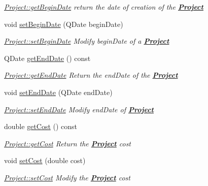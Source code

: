 \begin{DoxyCompactItemize}
\begin{DoxyCompactList}\small\item\em \hyperlink{classModels_1_1Project_a31b8e46aabb1327499f7e36f170900e3}{Project\-::get\-Begin\-Date} return the date of creation of the {\bfseries \hyperlink{classModels_1_1Project}{Project}} \end{DoxyCompactList}\item 
void \hyperlink{classModels_1_1Project_a07dfb00cbec7442197a91bc0795ab14d}{set\-Begin\-Date} (Q\-Date begin\-Date)
\begin{DoxyCompactList}\small\item\em \hyperlink{classModels_1_1Project_a07dfb00cbec7442197a91bc0795ab14d}{Project\-::set\-Begin\-Date} Modify {\itshape begin\-Date} of a {\bfseries \hyperlink{classModels_1_1Project}{Project}} \end{DoxyCompactList}\item 
Q\-Date \hyperlink{classModels_1_1Project_aaf6792d15dcd65c3708e4a01b80e3108}{get\-End\-Date} () const 
\begin{DoxyCompactList}\small\item\em \hyperlink{classModels_1_1Project_aaf6792d15dcd65c3708e4a01b80e3108}{Project\-::get\-End\-Date} Return the {\itshape end\-Date} of the {\bfseries \hyperlink{classModels_1_1Project}{Project}} \end{DoxyCompactList}\item 
void \hyperlink{classModels_1_1Project_a89e9603b862d0a282e4eb03e122e8c05}{set\-End\-Date} (Q\-Date end\-Date)
\begin{DoxyCompactList}\small\item\em \hyperlink{classModels_1_1Project_a89e9603b862d0a282e4eb03e122e8c05}{Project\-::set\-End\-Date} Modify {\itshape end\-Date} of {\bfseries \hyperlink{classModels_1_1Project}{Project}} \end{DoxyCompactList}\item 
double \hyperlink{classModels_1_1Project_a6ad25c30f89821cd988a7ae92d84b41b}{get\-Cost} () const 
\begin{DoxyCompactList}\small\item\em \hyperlink{classModels_1_1Project_a6ad25c30f89821cd988a7ae92d84b41b}{Project\-::get\-Cost} Return the {\bfseries \hyperlink{classModels_1_1Project}{Project}} {\itshape cost} \end{DoxyCompactList}\item 
void \hyperlink{classModels_1_1Project_a840437ed81c595608bd285cac4065082}{set\-Cost} (double cost)
\begin{DoxyCompactList}\small\item\em \hyperlink{classModels_1_1Project_a840437ed81c595608bd285cac4065082}{Project\-::set\-Cost} Modify the {\bfseries \hyperlink{classModels_1_1Project}{Project}} {\itshape cost} \end{DoxyCompactList}\item 

\end{DoxyCompactItemize}
